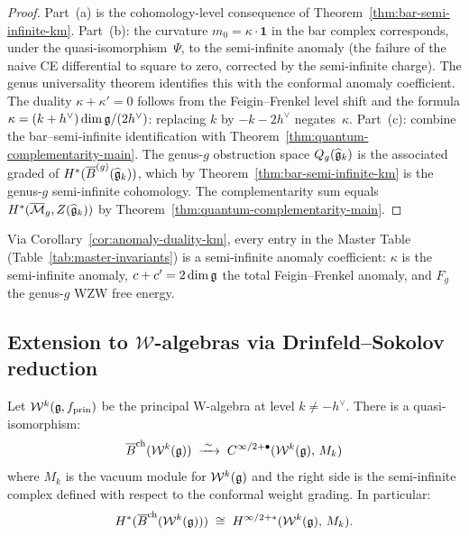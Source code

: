 \begin{proof}
Part~(a) is the cohomology-level consequence of
Theorem~\ref{thm:bar-semi-infinite-km}.  Part~(b): the
curvature $m_0 = \kappa \cdot \mathbf{1}$ in the bar complex
corresponds, under the quasi-isomorphism~$\Psi$, to the
semi-infinite anomaly (the failure of the naive CE differential
to square to zero, corrected by the semi-infinite charge).
The genus universality theorem identifies this with the
conformal anomaly coefficient.  The duality $\kappa + \kappa' = 0$
follows from the Feigin--Frenkel level shift and the formula
$\kappa = (k+h^\vee)\dim\mathfrak{g}/(2h^\vee)$: replacing $k$ by
$-k - 2h^\vee$ negates~$\kappa$.
Part~(c): combine the bar--semi-infinite identification with
Theorem~\ref{thm:quantum-complementarity-main}.  The genus-$g$
obstruction space $Q_g(\widehat{\mathfrak{g}}_k)$ is the associated
graded of $H^*(\overline{B}^{(g)}(\widehat{\mathfrak{g}}_k))$, which by
Theorem~\ref{thm:bar-semi-infinite-km} is the genus-$g$
semi-infinite cohomology.  The complementarity sum equals
$H^*(\overline{\mathcal{M}}_g, Z(\widehat{\mathfrak{g}}_k))$ by
Theorem~\ref{thm:quantum-complementarity-main}.
\end{proof}

\begin{remark}
\label{rem:master-table-brst}
Via Corollary~\ref{cor:anomaly-duality-km}, every entry in the Master Table (Table~\ref{tab:master-invariants}) is a semi-infinite anomaly coefficient: $\kappa$ is the semi-infinite anomaly, $c + c' = 2\dim\mathfrak{g}$ the total Feigin--Frenkel anomaly, and $F_g$ the genus-$g$ WZW free energy.
\end{remark}

\subsection{Extension to $\mathcal{W}$-algebras via Drinfeld--Sokolov reduction}

\begin{theorem}[Bar complex = semi-infinite complex for \texorpdfstring{$\mathcal{W}$}{W}-algebras;
\ClaimStatusProvedHere]
\label{thm:bar-semi-infinite-w}
Let $\mathcal{W}^k(\mathfrak{g}, f_{\mathrm{prin}})$ be the principal
W-algebra at level $k \neq -h^\vee$.  There is a quasi-isomorphism:
\begin{equation}\label{eq:bar-semi-infinite-w}
\overline{B}^{\mathrm{ch}}(\mathcal{W}^k(\mathfrak{g}))
\;\xrightarrow{\;\sim\;}\;
C^{\infty/2+\bullet}(\mathcal{W}^k(\mathfrak{g}),\, M_k)
\end{equation}
where $M_k$ is the vacuum module for $\mathcal{W}^k(\mathfrak{g})$ and the
right side is the semi-infinite complex defined with respect to the
conformal weight grading.  In particular:
\[
H^*(\overline{B}^{\mathrm{ch}}(\mathcal{W}^k(\mathfrak{g})))
\;\cong\;
H^{\infty/2+*}(\mathcal{W}^k(\mathfrak{g}),\, M_k).
\]
\end{theorem}

